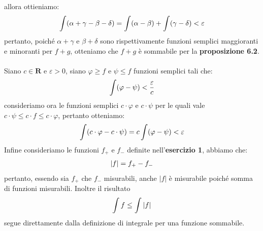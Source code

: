 \documentclass{article}
\begin{document}
allora ottieniamo:
\begin{gather}
    \int (\alpha + \gamma - \beta - \delta) = \int (\alpha - \beta) + \int (\gamma - \delta) < \varepsilon \notag
\end{gather}
pertanto, poiché $\alpha + \gamma$ e $\beta + \delta$ sono rispettivamente funzioni semplici maggioranti e minoranti per $f + g$, otteniamo che $f + g$ è sommabile per la \textbf{proposizione 6.2}. \\ \\
Siano $c \in \mathbf{R}$ e $\varepsilon > 0$, siano $\varphi \geq f$ e $\psi \leq f$ funzioni semplici tali che:
\begin{gather}
    \int (\varphi - \psi) < \frac{\varepsilon}{c} \notag
\end{gather}
consideriamo ora le funzioni semplici $c \cdot \varphi$ e $c \cdot \psi$ per le quali vale $c \cdot \psi \leq c \cdot f \leq c \cdot \varphi$, pertanto otteniamo:
\begin{equation}
    \int (c \cdot \varphi - c \cdot \psi) = c \int (\varphi - \psi) < \varepsilon \notag
\end{equation}
Infine consideriamo le funzioni $f_+$ e $f_-$ definite nell'\textbf{esercizio 1}, abbiamo che:
\begin{gather}
    | f | = f_+ - f_- \notag
\end{gather}
pertanto, essendo sia $f_+$ che $f_-$ misurabili, anche $|f|$ è misurabile poiché somma di funzioni misurabili. Inoltre il risultato
\begin{gather}
    \int f \leq \int |f| \notag
\end{gather}
segue direttamente dalla definizione di integrale per una funzione sommabile. \newpage
\end{document}
